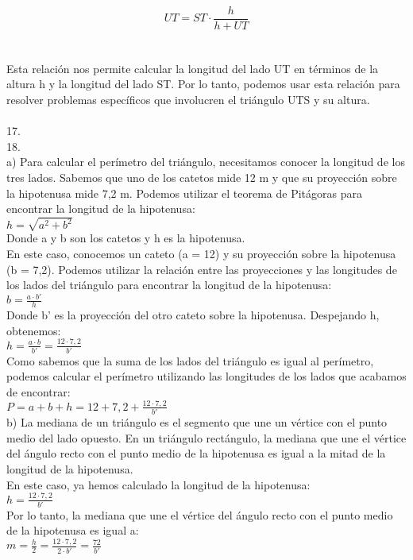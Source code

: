 \documentclass{article}
\begin{document}
\\
$$UT = ST \cdot \frac{h}{h + UT}$$\\
\\
Esta relación nos permite calcular la longitud del lado UT en términos de la altura h y la longitud del lado ST. Por lo tanto, podemos usar esta relación para resolver problemas específicos que involucren el triángulo UTS y su altura.\\
\\
{\Large 17.}
\\
{\Large 18.}
\\
a) Para calcular el perímetro del triángulo, necesitamos conocer la longitud de los tres lados. Sabemos que uno de los catetos mide 12 m y que su proyección sobre la hipotenusa mide 7,2 m. Podemos utilizar el teorema de Pitágoras para encontrar la longitud de la hipotenusa:\\
$h = \sqrt{a^2 + b^2}$\\
Donde a y b son los catetos y h es la hipotenusa.\\
En este caso, conocemos un cateto (a = 12) y su proyección sobre la hipotenusa (b = 7,2). Podemos utilizar la relación entre las proyecciones y las longitudes de los lados del triángulo para encontrar la longitud de la hipotenusa:\\
$b = \frac{a \cdot b'}{h}$\\
Donde b' es la proyección del otro cateto sobre la hipotenusa. Despejando h, obtenemos:\\
$h = \frac{a \cdot b}{b'} = \frac{12 \cdot 7,2}{b'}$\\
Como sabemos que la suma de los lados del triángulo es igual al perímetro, podemos calcular el perímetro utilizando las longitudes de los lados que acabamos de encontrar:\\
$P = a + b + h = 12 + 7,2 + \frac{12 \cdot 7,2}{b'}$\\
b) La mediana de un triángulo es el segmento que une un vértice con el punto medio del lado opuesto. En un triángulo rectángulo, la mediana que une el vértice del ángulo recto con el punto medio de la hipotenusa es igual a la mitad de la longitud de la hipotenusa.\\
En este caso, ya hemos calculado la longitud de la hipotenusa:\\
$h = \frac{12 \cdot 7,2}{b'}$\\
Por lo tanto, la mediana que une el vértice del ángulo recto con el punto medio de la hipotenusa es igual a:\\
$m = \frac{h}{2} = \frac{12 \cdot 7,2}{2 \cdot b'} = \frac{72}{b'}$\\
\end{document}
